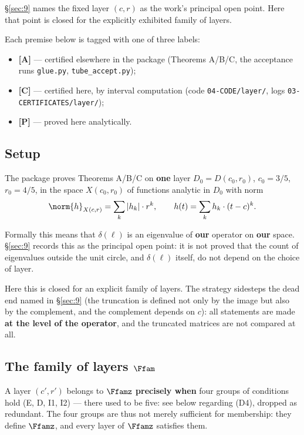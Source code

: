 \S\ref{sec:9} names the fixed layer $(c, r)$ as the work's principal
open point. Here that point is closed for the explicitly exhibited
family of layers.

Each premise below is tagged with one of three labels:

\begin{itemize}
\item \textbf{[A]} --- certified elsewhere in the package (Theorems A/B/C, the
  acceptance runs \texttt{glue.py}, \texttt{tube\_\allowbreak accept.py});
\item \textbf{[C]} --- certified here, by interval computation (code
  \texttt{04-\allowbreak CODE/\allowbreak layer/\allowbreak }, logs \texttt{03-\allowbreak CERTIFICATES/\allowbreak layer/\allowbreak });
\item \textbf{[P]} --- proved here analytically.
\end{itemize}


\subsection{Setup}
\label{sec:10.1}

The package proves Theorems A/B/C on \textbf{one} layer $D_0 = D(c_0, r_0)$,
$c_0 = 3/5$, $r_0 = 4/5$, in the space $X(c_0,r_0)$ of functions analytic
in $D_0$ with norm
\[
\norm{h}_{X(c,r)} = \sum_k |h_k| \cdot r^k , \qquad h(t) = \sum_k h_k \cdot (t - c)^k .
\]

Formally this means that $\delta(\ell)$ is an eigenvalue of \textbf{our} operator
on \textbf{our} space. \S\ref{sec:9} records this as the principal open point: it is
not proved that the count of eigenvalues outside the unit circle, and
$\delta(\ell)$ itself, do not depend on the choice of layer.

Here this is closed for an explicit family of layers. The strategy
sidesteps the dead end named in \S\ref{sec:9} (the truncation is defined not
only by the image but also by the complement, and the complement
depends on $c$): all statements are made \textbf{at the level of the
operator}, and the truncated matrices are not compared at all.


\subsection{The family of layers $\Ffam$}
\label{sec:10.2}

A layer $(c', r')$ belongs to $\Ffamz$ \textbf{precisely when} four groups of
conditions hold (E, D, I1, I2) --- there used to be five: see below regarding
(D4), dropped as redundant. The four groups are thus not merely sufficient for
membership: they define $\Ffamz$, and every layer of $\Ffamz$ satisfies them.


